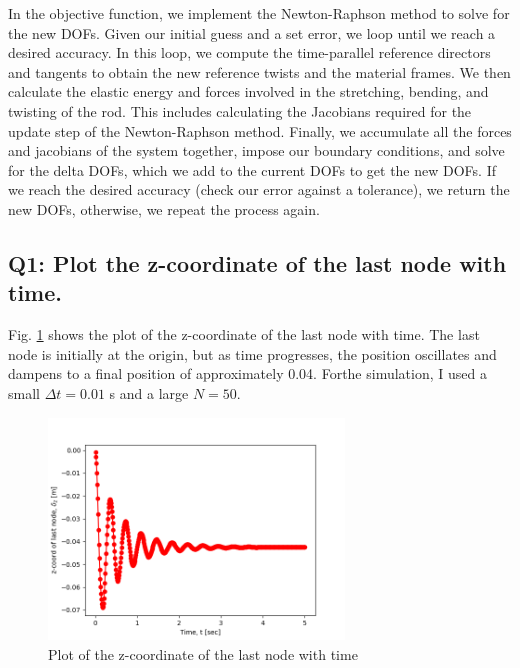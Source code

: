 \documentclass[letterpaper, 10 pt, conference]{ieeeconf}  %
\begin{document}
In the objective function, we implement the Newton-Raphson method to solve for the new DOFs. Given our initial guess and a set error, we loop until we reach a desired accuracy. In this loop, we compute the time-parallel reference directors and tangents to obtain the new reference twists and the material frames. We then calculate the elastic energy and forces involved in the stretching, bending, and twisting of the rod. This includes calculating the Jacobians required for the update step of the Newton-Raphson method. Finally, we accumulate all the forces and jacobians of the system together, impose our boundary conditions, and solve for the delta DOFs, which we add to the current DOFs to get the new DOFs. If we reach the desired accuracy (check our error against a tolerance), we return the new DOFs, otherwise, we repeat the process again.

\subsection*{Q1: Plot the z-coordinate of the last node with time.}

Fig. \ref{"fig:p2q1_last_node"} shows the plot of the z-coordinate of the last node with time. The last node is initially at the origin, but as time progresses, the position oscillates and dampens to a final position of approximately 0.04. Forthe simulation, I used a small $\Delta t = 0.01$ s and a large $N = 50$. 

\begin{figure}[!ht]
        \centering
        \includegraphics[width=0.7\textwidth,keepaspectratio]{last_node.png}
        \caption{Plot of the z-coordinate of the last node with time}
        \label{"fig:p2q1_last_node"}
\end{figure}




\end{document}
